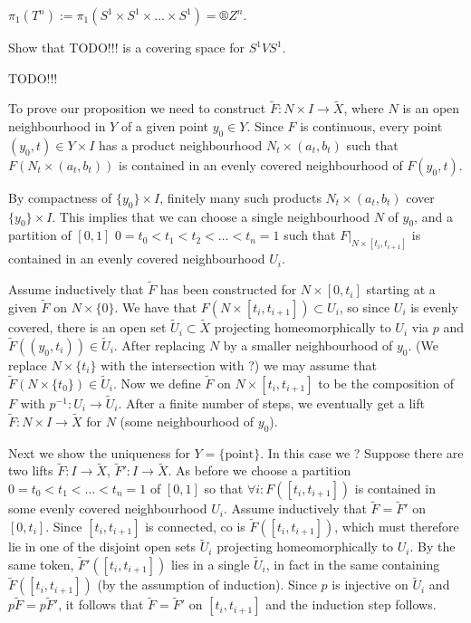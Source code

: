 \documentclass[12pt]{article}					%
\begin{document}
\begin{dusledek}
	$π_1(T^n) := π_1(S^1 \times S^1 \times … \times S^1) = ®Z^n$.
\end{dusledek}

\begin{priklad}
	Show that TODO!!! is a covering space for $S^1 V S^1$.
\end{priklad}

TODO!!!


\begin{dukaz}[Proposition *]
	To prove our proposition we need to construct $\tilde F: N \times I \rightarrow \tilde X$, where $N$ is an open neighbourhood in $Y$ of a given point $y_0 \in Y$. Since $F$ is continuous, every point $(y_0, t) \in Y \times I$ has a product neighbourhood $N_t \times (a_t, b_t)$ such that $F(N_t \times (a_t, b_t))$ is contained in an evenly covered neighbourhood of $F(y_0, t)$.

	By compactness of $\{y_0\} \times I$, finitely many such products $N_t \times (a_t, b_t)$ cover $\{y_0\} \times I$. This implies that we can choose a single neighbourhood $N$ of $y_0$, and a partition of $[0, 1]$ $0 = t_0 < t_1 < t_2 < … < t_n = 1$ such that $F|_{N \times [t_i, t_{i+1}]}$ is contained in an evenly covered neighbourhood $U_i$.

	Assume inductively that $\tilde F$ has been constructed for $N \times [0, t_i]$ starting at a given $\tilde F$ on $N \times \{0\}$. We have that $F(N \times [t_i, t_{i+1}]) \subset U_i$, so since $U_i$ is evenly covered, there is an open set $\tilde U_i \subset \tilde X$ projecting homeomorphically to $U_i$ via $p$ and $\tilde F((y_0, t_i)) \in \tilde U_i$. After replacing $N$ by a smaller neighbourhood of $y_0$. (We replace $N \times \{t_i\}$ with the intersection with ?) we may assume that $\tilde F(N \times \{t_0\}) \in \tilde U_i$. Now we define $\tilde F$ on $N \times [t_i, t_{i+1}]$ to be the composition of $F$ with $p^{-1}: U_i \rightarrow \tilde U_i$. After a finite number of steps, we eventually get a lift $\tilde F: N \times I \rightarrow \tilde X$ for $N$ (some neighbourhood of $y_0$).

	Next we show the uniqueness for $Y = \{\text{point}\}$. In this case we ?
	Suppose there are two lifts $\tilde F: I \rightarrow \tilde X$, $\tilde F': I \rightarrow \tilde X$. As before we choose a partition $0 = t_0 < t_1 < … < t_n = 1$ of $[0, 1]$ so that $\forall i: F([t_i, t_{i+1}])$ is contained in some evenly covered neighbourhood $U_i$. Assume inductively that $\tilde F = \tilde F'$ on $[0, t_i]$. Since $[t_i, t_{i+1}]$ is connected, co is $\tilde F([t_i, t_{i+1}])$, which must therefore lie in one of the disjoint open sets $\tilde U_i$ projecting homeomorphically to $U_i$. By the same token, $\tilde F'([t_i, t_{i+1}])$ lies in a single $\tilde U_i$, in fact in the same containing $\tilde F([t_i, t_{i+1}])$ (by the assumption of induction). Since $p$ is injective on $\tilde U_i$ and $p \tilde F = p \tilde F'$, it follows that $\tilde F = \tilde F'$ on $[t_i, t_{i+1}]$ and the induction step follows.


\end{dukaz}
\end{document}
